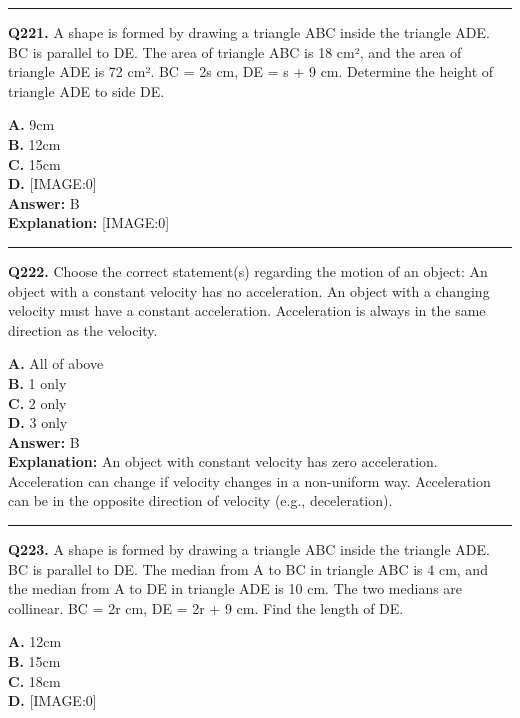 \documentclass[12pt]{article}
\begin{document}
\hrule
\vspace{1em}


\noindent
\textbf{Q221.} A shape is formed by drawing a triangle ABC inside the triangle ADE. BC is parallel to DE. The area of triangle ABC is 18 cm², and the area of triangle ADE is 72 cm². BC = 2s cm, DE = s + 9 cm.
Determine the height of triangle ADE to side DE.



\textbf{A.} 9cm \\
\textbf{B.} 12cm \\
\textbf{C.} 15cm \\
\textbf{D.} [IMAGE:0] \\

\textbf{Answer:} B \\
\textbf{Explanation:} [IMAGE:0]

\hrule
\vspace{1em}


\noindent
\textbf{Q222.} Choose the correct statement(s) regarding the motion of an object:
An object with a constant velocity has no acceleration.
An object with a changing velocity must have a constant acceleration.
Acceleration is always in the same direction as the velocity.



\textbf{A.} All of above \\
\textbf{B.} 1 only \\
\textbf{C.} 2 only \\
\textbf{D.} 3 only \\

\textbf{Answer:} B \\
\textbf{Explanation:} An object with constant velocity has zero acceleration. Acceleration can change if velocity changes in a non-uniform way. Acceleration can be in the opposite direction of velocity (e.g., deceleration).

\hrule
\vspace{1em}


\noindent
\textbf{Q223.} A shape is formed by drawing a triangle ABC inside the triangle ADE. BC is parallel to DE. The median from A to BC in triangle ABC is 4 cm, and the median from A to DE in triangle ADE is 10 cm. The two medians are collinear. BC = 2r cm, DE = 2r + 9 cm.
Find the length of DE.



\textbf{A.} 12cm \\
\textbf{B.} 15cm \\
\textbf{C.} 18cm \\
\textbf{D.} [IMAGE:0] \\
\end{document}
